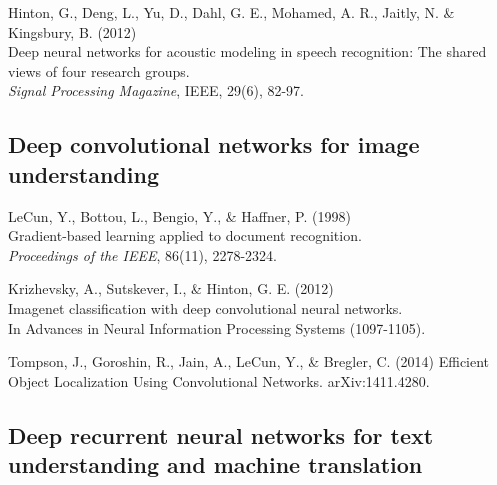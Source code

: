 \documentclass[]{article}
\begin{document}
Hinton, G., Deng, L., Yu, D., Dahl, G. E., Mohamed, A. R., Jaitly, N. \&
Kingsbury, B. (2012)\\ Deep neural networks for acoustic modeling in speech
recognition: The shared views of four research groups.\\ {\it Signal
  Processing Magazine}, IEEE, 29(6), 82-97.


\subsection{Deep convolutional networks for image understanding}
LeCun, Y., Bottou, L., Bengio, Y., \& Haffner, P. (1998)\\ Gradient-based
learning applied to document recognition.\\ {\it Proceedings of the IEEE},
86(11), 2278-2324.


Krizhevsky, A., Sutskever, I., \& Hinton, G. E. (2012)\\ Imagenet
classification with deep convolutional neural networks.\\ In Advances in
Neural Information Processing Systems (1097-1105).



Tompson, J., Goroshin, R., Jain, A., LeCun, Y., \& Bregler, C. (2014)
Efficient Object Localization Using Convolutional
Networks. arXiv:1411.4280.


\subsection{Deep recurrent neural networks for text understanding and machine translation}
\end{document}
